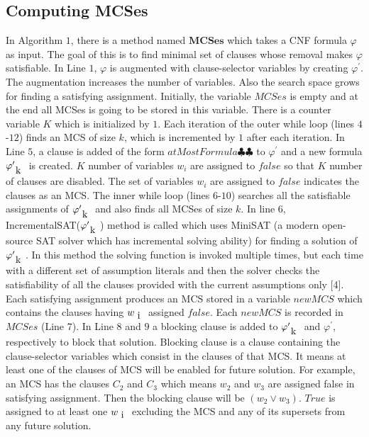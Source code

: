 \subsection{Computing MCSes}
In Algorithm $1$, there is a method named $\textbf{MCSes}$ which takes a CNF formula $\varphi$ as input. The goal of this is to find minimal set of clauses whose removal makes $\varphi$ satisfiable. In Line $1$, $\varphi$ is augmented with clause-selector variables by creating $\varphi^{\prime}$. The augmentation increases the number of variables. Also the search space grows for finding a satisfying assignment. Initially, the variable $MCSes$ is empty and  at the end all MCSes is going to be stored in this variable. There is a counter variable $K$ which is initialized by $1$.\newline
Each iteration of the outer while loop (lines $4$-$12$) finds an MCS of size $k$, which is incremented by $1$ after each iteration. In Line $5$, a clause is added of the form $atMostFormula\clubsuit\clubsuit$ to $\varphi^{\prime}$ and a new formula $\varphi^{\prime}_{\text k}$ is created. $K$ number of variables $w_{i}$ are assigned to $false$ so that $K$ number of clauses are disabled. The set of variables $w_{i}$ are assigned to $false$ indicates the clauses as an MCS.\newline
The inner while loop (lines $6$-$10$) searches all the satisfiable assignments of $\varphi^{\prime}_{\text k}$ and also finds all MCSes of size $k$. In line $6$, IncrementalSAT($\varphi^{\prime}_{\text k}$) method is called which uses MiniSAT (a modern open-source SAT solver which has incremental solving ability) for finding a solution of $\varphi^{\prime}_{\text k}$. In this method the solving function is invoked multiple times, but each time with a different set of assumption literals and then the solver checks the satisfiability of all the clauses provided with the current assumptions only [4]. Each satisfying assignment produces an MCS stored in a variable $newMCS$ which contains the clauses having $w_{\text i}$ assigned $false$. Each $newMCS$ is recorded in $MCSes$ (Line $7$). In Line $8$ and $9$ a blocking clause is added to $\varphi^{\prime}_{\text k}$ and $\varphi^{\prime}$, respectively to block that solution. Blocking clause is a clause containing the clause-selector variables which consist in the clauses of that MCS. It means at least one of the clauses of MCS will be enabled for future solution. For example, an MCS has the clauses $C_{2}$ and $C_{3}$ which means $w_{2}$ and $w_{3}$ are assigned false in satisfying assignment. Then the blocking clause will be $(w_{2}\vee w_{3})$. $True$ is assigned to at least one $w_{\text i}$ excluding the MCS and any of its supersets from any future solution.\newline
